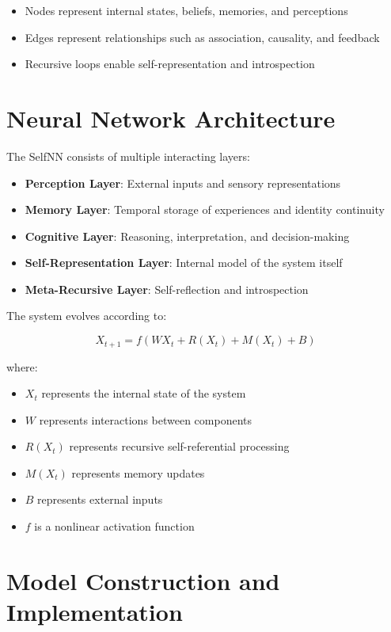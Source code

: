 \documentclass[12pt]{article}
\begin{document}
\begin{itemize}
\item Nodes represent internal states, beliefs, memories, and perceptions
\item Edges represent relationships such as association, causality, and feedback
\item Recursive loops enable self-representation and introspection
\end{itemize}

\section{Neural Network Architecture}

The SelfNN consists of multiple interacting layers:

\begin{itemize}
\item \textbf{Perception Layer}: External inputs and sensory representations
\item \textbf{Memory Layer}: Temporal storage of experiences and identity continuity
\item \textbf{Cognitive Layer}: Reasoning, interpretation, and decision-making
\item \textbf{Self-Representation Layer}: Internal model of the system itself
\item \textbf{Meta-Recursive Layer}: Self-reflection and introspection
\end{itemize}

The system evolves according to:

\[
X_{t+1} = f(WX_t + R(X_t) + M(X_t) + B)
\]

where:
\begin{itemize}
\item $X_t$ represents the internal state of the system
\item $W$ represents interactions between components
\item $R(X_t)$ represents recursive self-referential processing
\item $M(X_t)$ represents memory updates
\item $B$ represents external inputs
\item $f$ is a nonlinear activation function
\end{itemize}

\section{Model Construction and Implementation}
\end{document}
